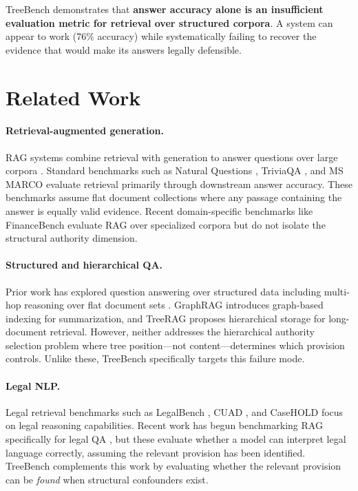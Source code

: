 \documentclass[11pt]{article}
\begin{document}
TreeBench demonstrates that \textbf{answer accuracy alone is an insufficient evaluation metric for retrieval over structured corpora}. A system can appear to work (76\% accuracy) while systematically failing to recover the evidence that would make its answers legally defensible.


\section{Related Work}
\label{sec:related}

\paragraph{Retrieval-augmented generation.} RAG systems combine retrieval with generation to answer questions over large corpora \citep{lewis2020rag, gao2024ragsurvey}. Standard benchmarks such as Natural Questions \citep{kwiatkowski2019nq}, TriviaQA \citep{joshi2017triviaqa}, and MS MARCO \citep{nguyen2016msmarco} evaluate retrieval primarily through downstream answer accuracy. These benchmarks assume flat document collections where any passage containing the answer is equally valid evidence. Recent domain-specific benchmarks like FinanceBench \citep{islam2024financebench} evaluate RAG over specialized corpora but do not isolate the structural authority dimension.

\paragraph{Structured and hierarchical QA.} Prior work has explored question answering over structured data including multi-hop reasoning over flat document sets \citep{yang2018hotpotqa}. GraphRAG \citep{edge2024graphrag} introduces graph-based indexing for summarization, and TreeRAG \citep{tao2025treerag} proposes hierarchical storage for long-document retrieval. However, neither addresses the hierarchical authority selection problem where tree position---not content---determines which provision controls. Unlike these, TreeBench specifically targets this failure mode.

\paragraph{Legal NLP.} Legal retrieval benchmarks such as LegalBench \citep{guha2023legalbench}, CUAD \citep{hendrycks2021cuad}, and CaseHOLD \citep{zheng2021casehold} focus on legal reasoning capabilities. Recent work has begun benchmarking RAG specifically for legal QA \citep{pipitone2024legalbenchrag}, but these evaluate whether a model can interpret legal language correctly, assuming the relevant provision has been identified. TreeBench complements this work by evaluating whether the relevant provision can be \emph{found} when structural confounders exist.
\end{document}
